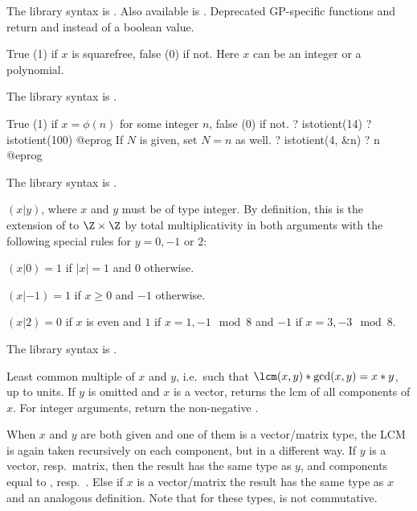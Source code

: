 The library syntax is .
Also available is . Deprecated
GP-specific functions  and
 return  and 
instead of a boolean value.

\label{se:issquarefree}
True (1) if $x$ is squarefree, false (0) if not. Here $x$ can be an
integer or a polynomial.

The library syntax is .

\label{se:istotient}
True (1) if $x = \phi(n)$ for some integer $n$, false (0)
if not.
\bprog
? istotient(14)
? istotient(100)
@eprog
If $N$ is given, set $N = n$ as well.
\bprog
? istotient(4, &n)
? n
@eprog

The library syntax is .

\label{se:kronecker}
 $(x|y)$, where $x$ and $y$ must be of type integer. By
definition, this is the extension of  to $\Z \times \Z$
by total multiplicativity in both arguments with the following special rules
for $y = 0, -1$ or $2$:

\item $(x|0) = 1$ if $|x| = 1$ and $0$ otherwise.

\item $(x|-1) = 1$ if $x \geq 0$ and $-1$ otherwise.

\item $(x|2) = 0$ if $x$ is even and $1$ if $x = 1,-1 \mod 8$ and $-1$
if $x=3,-3 \mod 8$.

The library syntax is .

\label{se:lcm}
Least common multiple of $x$ and $y$, i.e.~such
that $\lcm(x,y)*\gcd(x,y) = x*y$, up to units. If $y$ is omitted and $x$
is a vector, returns the $\text{lcm}$ of all components of $x$.
For integer arguments, return the non-negative .

When $x$ and $y$ are both given and one of them is a vector/matrix type,
the LCM is again taken recursively on each component, but in a different way.
If $y$ is a vector, resp.~matrix, then the result has the same type as $y$,
and components equal to , resp.~. Else
if $x$ is a vector/matrix the result has the same type as $x$ and an
analogous definition. Note that for these types,  is not
commutative.

